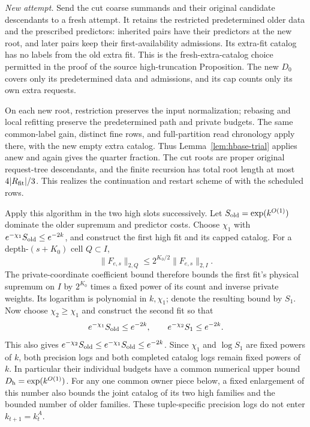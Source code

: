 \emph{New attempt.}  Send the cut coarse summands and their original
candidate descendants to a fresh attempt.  It retains the restricted
predetermined older data and the prescribed predictors: inherited
pairs have their predictors at the new root, and later pairs keep
their first-availability admissions.  Its extra-fit catalog has no
labels from the old extra fit.  This is the fresh-extra-catalog
choice permitted in the proof of the source high-truncation
Proposition.  The new \(D_0\) covers only its predetermined data
and admissions, and its cap counts only its own extra requests.

On each new root, restriction preserves the input normalization;
rebasing and local refitting preserve the predetermined path and
private budgets.  The same common-label gain, distinct fine rows,
and full-partition read chronology apply there, with the new empty
extra catalog.  Thus Lemma~\ref{lem:hbase-trial} applies anew and
again gives the quarter fraction.  The cut roots are proper original
request-tree descendants, and the finite recursion has total root
length at most \(4|R_{\rm fit}|/3\).  This realizes the continuation
and restart scheme of \cite[Section~5]{H} with the scheduled rows.

Apply this algorithm in the two high slots successively.  Let
\(S_{\rm old}=\exp(k^{O(1)})\) dominate the older supremum and
predictor costs.  Choose \(\chi_1\) with
\(e^{-\chi_1}S_{\rm old}\le e^{-2k}\), and construct the first high
fit and its capped catalog.  For a depth-\((s+K_0)\) cell \(Q\subset I\),
\[
 \|F_{e,s}\|_{2,Q}\le2^{K_0/2}\|F_{e,s}\|_{2,I}.
\]
The private-coordinate coefficient bound therefore bounds the first
fit's physical supremum on \(I\) by \(2^{K_0}\) times a fixed power
of its count and inverse private weights.  Its logarithm is
polynomial in \(k,\chi_1\); denote the resulting bound by \(S_1\).
Now choose \(\chi_2\ge\chi_1\) and construct the second fit so that
\[
 e^{-\chi_1}S_{\rm old}\le e^{-2k},\qquad
 e^{-\chi_2}S_1\le e^{-2k}.
\]
This also gives \(e^{-\chi_2}S_{\rm old}\le
e^{-\chi_1}S_{\rm old}\le e^{-2k}\).  Since \(\chi_1\) and \(\log S_1\)
are fixed powers of \(k\), both precision logs and both completed
catalog logs remain fixed powers of \(k\).  In particular their individual budgets have a common
numerical upper bound \(D_{\rm h}=\exp(k^{O(1)})\).  For any one
common owner piece below, a fixed enlargement of this number also
bounds the joint catalog of its two high families and the bounded
number of older families.  These
tuple-specific precision logs do not enter \(k_{t+1}=k_t^A\).

